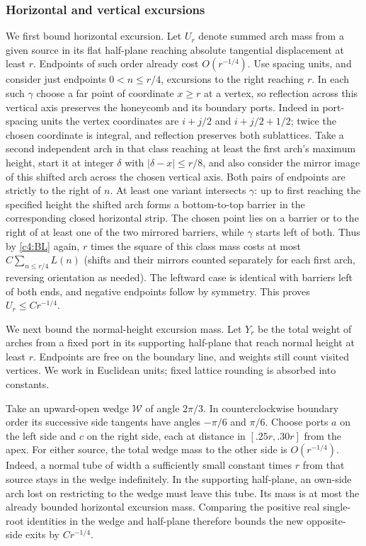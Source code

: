\subsubsection{Horizontal and vertical excursions}
We first bound horizontal excursion. Let \(U_r\) denote summed arch mass from a given source in its flat half-plane reaching absolute tangential displacement at least \(r\). Endpoints of such order already cost \(O(r^{-1/4})\). Use spacing units, and consider just endpoints \(0<n\le r/4\), excursions to the right reaching \(r\). In each such \(\gamma\) choose a far point of coordinate \(x\ge r\) at a vertex, so reflection across this vertical axis preserves the honeycomb and its boundary ports. Indeed in port-spacing units the vertex coordinates are $i+j/2$ and $i+j/2+1/2$; twice the chosen coordinate is integral, and reflection preserves both sublattices. Take a second independent arch in that class reaching at least the first arch's maximum height, start it at integer \(\delta\) with \(|\delta-x|\le r/8\), and also consider the mirror image of this shifted arch across the chosen vertical axis. Both pairs of endpoints are strictly to the right of \(n\). At least one variant intersects \(\gamma\): up to first reaching the specified height the shifted arch forms a bottom-to-top barrier in the corresponding closed horizontal strip. The chosen point lies on a barrier or to the right of at least one of the two mirrored barriers, while \(\gamma\) starts left of both. Thus by \eqref{c4:BL} again, \(r\) times the square of this class mass costs at most \(C\sum_{n\le r/4} L(n)\) (shifts and their mirrors counted separately for each first arch, reversing orientation as needed). The leftward case is identical with barriers left of both ends, and negative endpoints follow by symmetry. This proves \(U_r\le C r^{-1/4}\).

We next bound the normal-height excursion mass. Let $Y_r$ be the total
weight of arches from a fixed port in its supporting half-plane that
reach normal height at least $r$. Endpoints are free on the boundary
line, and weights still count visited vertices. We work in Euclidean
units; fixed lattice rounding is absorbed into constants.

Take an upward-open wedge $\mathcal W$ of angle $2\pi/3$. In
counterclockwise boundary order its successive side tangents have
angles $-\pi/6$ and $\pi/6$. Choose ports $a$ on the left side and $c$
on the right side, each at distance in $[.25r,.30r]$ from the apex.
For either source, the total wedge mass to the other side is
$O(r^{-1/4})$. Indeed, a normal tube of width a sufficiently small
constant times $r$ from that source stays in the wedge indefinitely.
In the supporting half-plane, an own-side arch lost on restricting to
the wedge must leave this tube. Its mass is at most the already bounded
horizontal excursion mass. Comparing the positive real single-root
identities in the wedge and half-plane therefore bounds the new
opposite-side exits by $Cr^{-1/4}$.

